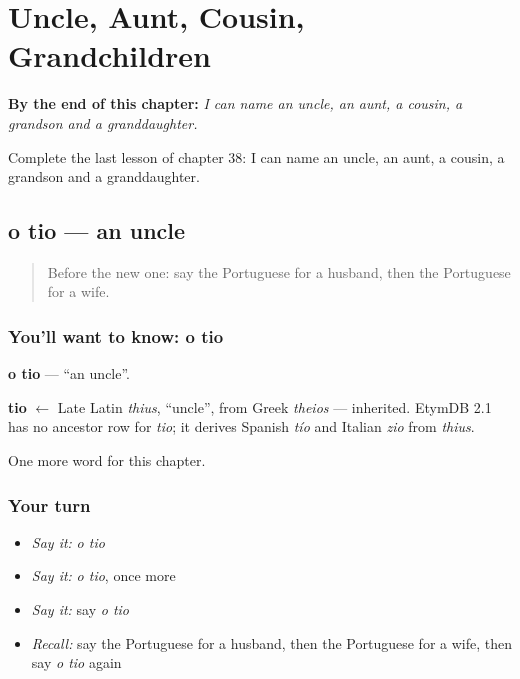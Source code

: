 
\chapter{Uncle, Aunt, Cousin, Grandchildren}
\label{ch:pt-uncle-aunt-cousin-grandchildren}

\begin{chapteropening}
\textbf{By the end of this chapter:} \emph{I can name an uncle, an aunt, a cousin, a grandson and a granddaughter.}

Complete the last lesson of chapter 38: I can name an uncle, an aunt, a cousin, a grandson and a granddaughter.
\end{chapteropening}

\section[o tio]{o tio — an uncle}

\label{lesson:PT-C38-tio}



\begin{quote}
Before the new one: say the Portuguese for a husband, then the Portuguese for a wife.
\end{quote}

\subsection*{You'll want to know: o tio}
\textbf{o tio} — \textquotedblleft{}an uncle\textquotedblright{}.

\begin{cousinweb}
\textbf{tio} $\leftarrow$ Late Latin \emph{thius}, \textquotedblleft{}uncle\textquotedblright{}, from Greek \emph{theios} — inherited. EtymDB 2.1 has no ancestor row for \emph{tio}; it derives Spanish \emph{tío} and Italian \emph{zio} from \emph{thius}.
\end{cousinweb}

\begin{grammarlens}[title={What you've built}]
One more word for this chapter.
\end{grammarlens}

\subsection*{Your turn}
\begin{itemize}
\raggedright
  \item \emph{Say it:} \emph{o tio}
  \item \emph{Say it:} \emph{o tio}, once more
  \item \emph{Say it:} say \emph{o tio}
  \item \emph{Recall:} say the Portuguese for a husband, then the Portuguese for a wife, then say \emph{o tio} again
\end{itemize}

